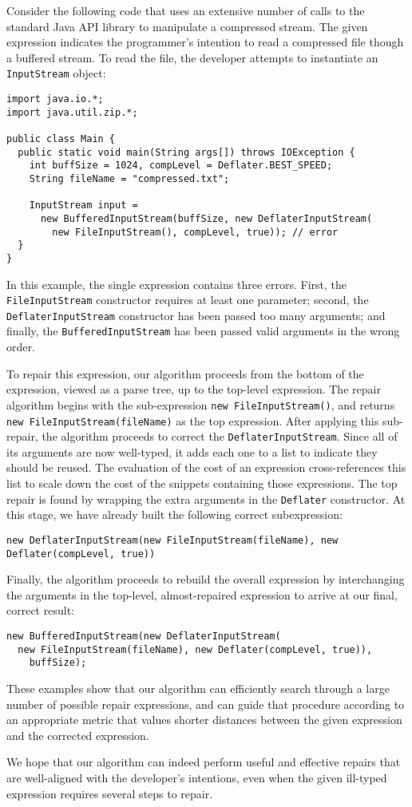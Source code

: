 Consider the following code that uses an extensive number of calls to the standard Java API library to manipulate a compressed stream. The given expression indicates the programmer's intention to read a compressed file though a buffered stream. To read the file, the developer attempts to instantiate an \lstinline{InputStream} object:
\begin{lstlisting}
import java.io.*;
import java.util.zip.*;

public class Main {
  public static void main(String args[]) throws IOException {
    int buffSize = 1024, compLevel = Deflater.BEST_SPEED;
    String fileName = "compressed.txt";
    
    InputStream input = 
      new BufferedInputStream(buffSize, new DeflaterInputStream(
        new FileInputStream(), compLevel, true)); // error 
  }
}
\end{lstlisting}
In this example, the single expression contains three errors. First, the \lstinline{FileInputStream} constructor requires at least one parameter; second, the \lstinline{DeflaterInputStream} constructor has been passed too many arguments; and finally, the \lstinline{BufferedInputStream} has been passed valid arguments in the wrong order.

To repair this expression, our algorithm proceeds from the bottom of the expression, viewed as a parse tree, up to the top-level expression. The repair algorithm begins with the sub-expression \lstinline{new FileInputStream()}, and returns \lstinline{new FileInputStream(fileName)} as the top expression. After applying this sub-repair, the algorithm proceeds to correct the \lstinline{DeflaterInputStream}. Since all of its arguments are now well-typed, it adds each one to a list to indicate they should be reused. The evaluation of the cost of an expression cross-references this list to scale down the cost of the snippets containing those expressions. The top repair is found by wrapping the extra arguments in the \lstinline{Deflater} constructor. At this stage, we have already built the following correct subexpression:
\begin{lstlisting}
new DeflaterInputStream(new FileInputStream(fileName), new Deflater(compLevel, true))
\end{lstlisting}
Finally, the algorithm proceeds to rebuild the overall expression by interchanging the arguments in the top-level, almost-repaired expression to arrive at our final, correct result:
\begin{lstlisting}   
new BufferedInputStream(new DeflaterInputStream(
  new FileInputStream(fileName), new Deflater(compLevel, true)),
    buffSize);
\end{lstlisting}
These examples show that our algorithm can efficiently search through a large number of possible repair expressions, and can guide that procedure according to an appropriate metric that values shorter distances between the given expression and the corrected expression.

We hope that our algorithm can indeed perform useful and effective repairs that are well-aligned with the developer's intentions, even when the given ill-typed expression requires several steps to repair.
